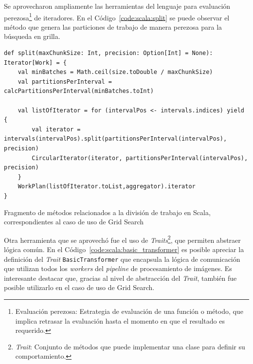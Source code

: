 \documentclass[11pt]{article}
\newcommand{\english}[1]{\textit{#1}}
\begin{document}
Se aprovecharon ampliamente las herramientas del lenguaje para evaluación perezosa\footnote{Evaluación perezosa: Estrategia de evaluación de una función o método, que implica retrasar la evaluación hasta el momento en que el resultado es requerido.} de iteradores. En el Código~\ref{code:scala:split} se puede observar el método que genera las particiones de trabajo de manera perezosa para la búsqueda en grilla.

\begin{listing}[ht]
\begin{verbatim}
def split(maxChunkSize: Int, precision: Option[Int] = None): Iterator[Work] = {
    val minBatches = Math.ceil(size.toDouble / maxChunkSize)
    val partitionsPerInterval = calcPartitionsPerInterval(minBatches.toInt)

    val listOfIterator = for (intervalPos <- intervals.indices) yield {
        val iterator = intervals(intervalPos).split(partitionsPerInterval(intervalPos), precision)
        CircularIterator(iterator, partitionsPerInterval(intervalPos), precision)
    }
    WorkPlan(listOfIterator.toList,aggregator).iterator
}
\end{verbatim}
\caption{Fragmento de métodos relacionados a la división de trabajo en Scala, correspondientes al caso de uso de Grid Search}
\label{code:scala:split}
\end{listing}

Otra herramienta que se aprovechó fue el uso de \english{Traits}\footnote{\english{Trait}: Conjunto de métodos que puede implementar una clase para definir su comportamiento.}, que permiten abstraer lógica común. En el Código~\ref{code:scala:basic_transformer} es posible apreciar la definición del \english{Trait} \lstinline{BasicTransformer} que encapsula la lógica de comunicación que utilizan todos los \english{workers} del \english{pipeline} de procesamiento de imágenes. Es interesante destacar que, gracias al nivel de abstracción del \english{Trait}, también fue posible utilizarlo en el caso de uso de Grid Search.
\end{document}

